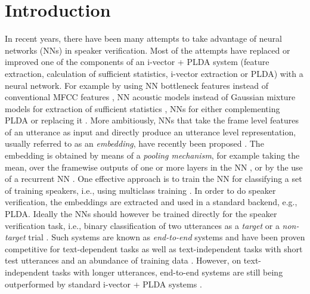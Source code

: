 \documentclass{article}
\begin{document}
\section{Introduction}
\label{sec:intro}
In recent years, there have been many attempts to take advantage of neural
networks (NNs) in speaker verification. 
Most of the attempts have replaced or improved one of the components
of an i-vector + PLDA system (feature extraction, calculation of sufficient statistics, i-vector extraction or PLDA) with a neural network. For example by using NN bottleneck features instead of conventional MFCC features \cite{lozano_odyssey_2016}, NN acoustic models instead of Gaussian mixture models for extraction of sufficient statistics \cite{Lei_icassp_2014}, NNs for either complementing PLDA \cite{Novoselov_interspeech_2015,Bhattacharya_SLT16} or replacing it \cite{Ghahabi_icassp_2014}. More ambitiously, NNs that take the frame level features of an utterance as input and directly produce an utterance level representation, usually referred to as an \emph{embedding}, have recently been proposed \cite{Variani_icassp_2014, heighold_icassp_2016, zhang_slt_2016, snyder_slt_2016, Bhattacharaya_interspeech_2017, snyder_interspeech_2017}. The embedding is obtained by means of a \emph{pooling mechanism}, for example taking the mean, over the framewise outputs of one or more layers in the NN \cite{Variani_icassp_2014}, or by the use of a recurrent NN \cite{heighold_icassp_2016}. 
One effective approach is to train the NN for classifying a set of training speakers, i.e., using multiclass training \cite{Variani_icassp_2014, Bhattacharaya_interspeech_2017, snyder_interspeech_2017}. In order to do speaker verification, the embeddings are extracted and used in a standard backend, e.g., PLDA. %
Ideally the NNs should however be trained directly for the speaker verification task, i.e., binary classification of two utterances as a \emph{target} or a \emph{non-target} trial \cite{heighold_icassp_2016, zhang_slt_2016, snyder_slt_2016}. Such systems are known as \emph{end-to-end} systems and have been proven competitive for text-dependent tasks \cite{heighold_icassp_2016, zhang_slt_2016} as well as text-independent tasks with short test utterances and an abundance of training data \cite{snyder_slt_2016}. However, on text-independent tasks with longer utterances, end-to-end systems are still being outperformed by standard i-vector + PLDA systems \cite{snyder_slt_2016}. 
\end{document}
